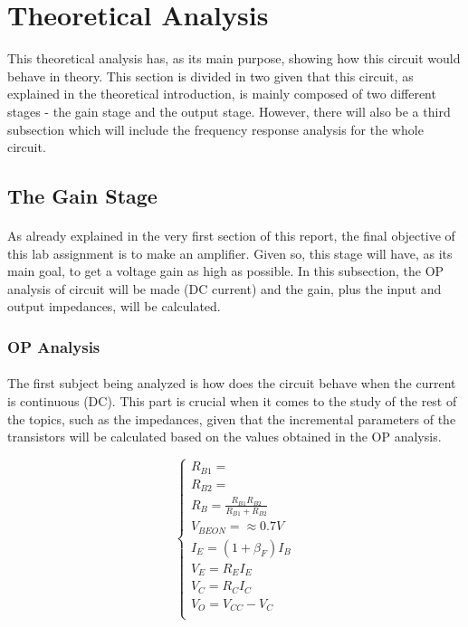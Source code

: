 \section{Theoretical Analysis}

This theoretical analysis has, as its main purpose, showing how this circuit would behave in theory. This section is divided in two given that this circuit, as explained in the theoretical introduction, is mainly composed of two different stages - the gain stage and the output stage. However, there will also be a third subsection which will include the frequency response analysis for the whole circuit.



\subsection{The Gain Stage}

\paragraph{}As already explained in the very first section of this report, the final objective of this lab assignment is to make an amplifier. Given so, this stage will have, as its main goal, to get a voltage gain as high as possible. In this subsection, the OP analysis of circuit will be made (DC current) and the gain, plus the input and output impedances,  will be calculated.


\subsubsection{OP Analysis}

\paragraph{}The first subject being analyzed is how does the circuit behave when the current is continuous (DC). This part is crucial when it comes to the study of the rest of the topics, such as the impedances, given that the incremental parameters of the transistors will be calculated based on the values obtained in the OP analysis.


\[ 
\left\{\begin{matrix}
R_{B1}=\\
R_{B2}=\\
R_B=\frac{R_{B1}R_{B2}}{R_{B1}+R_{B2}}\\
V_{BEON}=\approx 0.7 V\\
I_E=(1+\beta_F)I_B\\
V_E=R_E I_E\\
V_C=R_C I_C\\
V_O=V_{CC}-V_C\\
\end{matrix}\right.
\]


